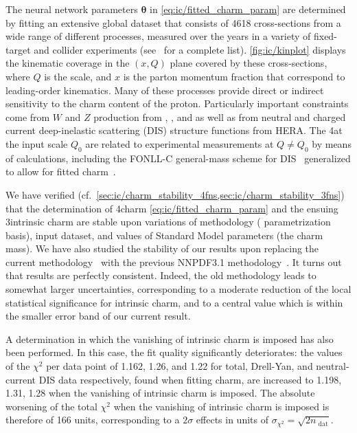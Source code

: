 The neural network parameters ${\boldsymbol \theta}$ in
\cref{eq:ic/fitted_charm_param}
are determined by fitting an extensive global dataset that consists of 4618 
cross-sections from a wide range of different processes, measured over
the years in a variety of fixed-target and collider experiments  (see~\cite{Ball:2021leu} for a complete list).
%
\cref{fig:ic/kinplot} displays the kinematic coverage in the $(x,Q)$ plane
covered by these cross-sections, where $Q$ is
the  scale, and  $x$ is
the parton momentum fraction that correspond to leading-order kinematics.
%
Many of these processes provide direct or indirect sensitivity 
to the charm content of the proton.
%
Particularly important constraints come from $W$ and $Z$ production from 
\atlas, \cms, and \lhcb as well as from
neutral and charged current deep-inelastic 
scattering (DIS) structure functions from HERA.
%
The 4\fns  \pdfs at the input scale $Q_0$ are related
to experimental measurements at $Q \not =Q_0$ by means of \nnlo \qcd calculations, including
the FONLL-C general-mass scheme for DIS~\cite{Forte:2010ta} generalized to 
allow for fitted charm~\cite{Ball:2015tna}.

We have verified (cf.\
\cref{sec:ic/charm_stability_4fns,sec:ic/charm_stability_3fns}) that the
determination of 4\fns charm \pdf \cref{eq:ic/fitted_charm_param} and the ensuing
3\fns intrinsic charm \pdf are  stable upon variations of methodology (\pdf
parametrization basis), input dataset, and values of Standard Model parameters
(the charm mass).
We have also studied the stability of our results upon replacing the
current \nnpdfr{4.0} methodology~\cite{Ball:2021leu} with the previous
NNPDF3.1 methodology~\cite{NNPDF:2017mvq}. It turns out that results
are  perfectly consistent. Indeed, the old methodology leads to somewhat larger
uncertainties, corresponding to a moderate reduction of the local statistical
significance for intrinsic charm, and to a central value which is
within the smaller  error band of our current result.


A determination in which the vanishing of intrinsic charm is
imposed has also been performed.
%
In this case, the fit quality significantly
deteriorates: the values of the $\chi^2$ per data point of 1.162,
1.26, and 1.22 for total, Drell-Yan, 
and neutral-current DIS data respectively, found when fitting charm, are 
increased to 1.198, 1.31, 1.28 when the vanishing of intrinsic charm
is imposed.
%
The absolute worsening of the total $\chi^2$ when the vanishing of intrinsic charm is imposed is therefore
of 166 units, corresponding to
a $2\sigma$ effects in units of $\sigma_{\chi^2}= \sqrt{2n_\textrm{ dat}}$.

